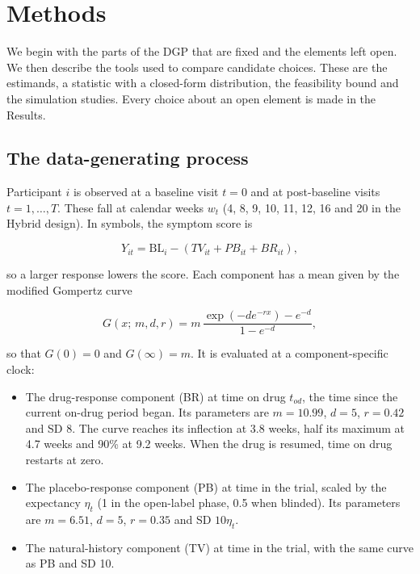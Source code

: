 \documentclass[
  11pt,
]{article}
\providecommand{\tightlist}{%
  \setlength{\itemsep}{0pt}\setlength{\parskip}{0pt}}
\begin{document}
\section{Methods}\label{methods}

We begin with the parts of the DGP that are fixed and the elements
left open. We then describe the tools used to compare candidate
choices. These are the estimands, a statistic with a closed-form
distribution, the feasibility bound and the simulation studies. Every
choice about an open element is made in the Results.

\subsection{The data-generating process}\label{the-data-generating-process}

Participant \(i\) is observed at a baseline visit \(t = 0\) and at
post-baseline visits \(t = 1, \ldots, T\). These fall at calendar weeks
\(w_t\) (4, 8, 9, 10, 11, 12, 16 and 20 in the Hybrid design). In
symbols, the symptom score is

\[Y_{it} = \mathrm{BL}_i - \left(TV_{it} + PB_{it} + BR_{it}\right),\]

so a larger response lowers the score. Each component has a mean given
by the modified Gompertz curve

\[G(x;\, m, d, r) = m\,\frac{\exp(-d e^{-rx}) - e^{-d}}{1 - e^{-d}},\]

so that \(G(0) = 0\) and \(G(\infty) = m\). It is evaluated at a
component-specific clock:

\begin{itemize}
\tightlist
\item
  The drug-response component (BR) at time on drug \(t_{od}\), the time
  since the current on-drug period began. Its parameters are
  \(m = 10.99\), \(d = 5\), \(r = 0.42\) and SD 8. The curve reaches its
  inflection at 3.8 weeks, half its maximum at 4.7 weeks and 90\% at
  9.2 weeks. When the drug is resumed, time on drug restarts at zero.
\item
  The placebo-response component (PB) at time in the trial, scaled by
  the expectancy \(\eta_t\) (1 in the open-label phase, 0.5 when
  blinded). Its parameters are \(m = 6.51\), \(d = 5\), \(r = 0.35\) and SD
  \(10\eta_t\).
\item
  The natural-history component (TV) at time in the trial, with the
  same curve as PB and SD 10.
\end{itemize}
\end{document}
